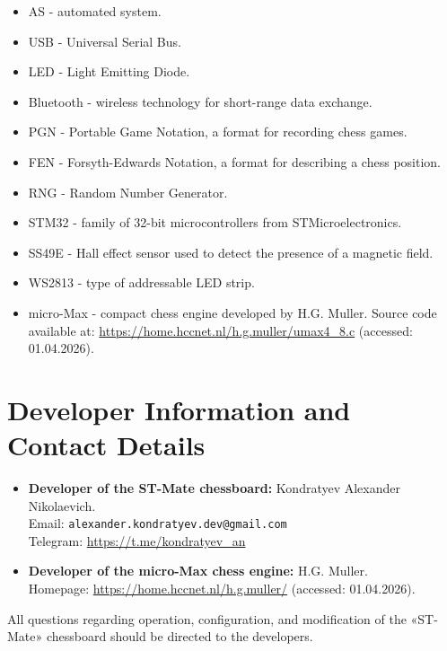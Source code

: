 \documentclass[a4paper,12pt]{article}
\begin{document}
\begin{itemize}
    \item AS - automated system.
    \item USB - Universal Serial Bus.
    \item LED - Light Emitting Diode.
    \item Bluetooth - wireless technology for short-range data exchange.
    \item PGN - Portable Game Notation, a format for recording chess games.
    \item FEN - Forsyth-Edwards Notation, a format for describing a chess position.
    \item RNG - Random Number Generator.
    \item STM32 - family of 32-bit microcontrollers from STMicroelectronics.
    \item SS49E - Hall effect sensor used to detect the presence of a magnetic field.
    \item WS2813 - type of addressable LED strip.
    \item micro-Max - compact chess engine developed by H.G. Muller. Source code available at: \url{https://home.hccnet.nl/h.g.muller/umax4_8.c} (accessed: 01.04.2026).
\end{itemize}

\section{Developer Information and Contact Details}
\label{sec:developers}

\begin{itemize}
    \item \textbf{Developer of the ST-Mate chessboard:} Kondratyev Alexander Nikolaevich.\\
          Email: \texttt{alexander.kondratyev.dev@gmail.com}\\
          Telegram: \url{https://t.me/kondratyev_an}
    \item \textbf{Developer of the micro-Max chess engine:} H.G. Muller.\\
          Homepage: \url{https://home.hccnet.nl/h.g.muller/} (accessed: 01.04.2026).
\end{itemize}
All questions regarding operation, configuration, and modification of the «ST-Mate» chessboard should be directed to the developers.

\newpage
\end{document}
